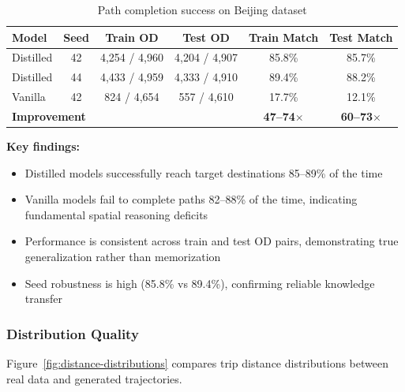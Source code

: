 \begin{table}[h]
    \centering
    \caption{Path completion success on Beijing dataset}
    \label{tab:od-results}
    \small
    \begin{tabular}{lccccc}
        \toprule
        \textbf{Model}                           & \textbf{Seed}           & \textbf{Train OD}       & \textbf{Test OD} & \textbf{Train Match} & \textbf{Test Match} \\
        \midrule
        Distilled                                & 42                      & 4,254 / 4,960           & 4,204 / 4,907    & 85.8\%               & 85.7\%              \\
        Distilled                                & 44                      & 4,433 / 4,959           & 4,333 / 4,910    & 89.4\%               & 88.2\%              \\
        Vanilla                                  & 42                      & 824 / 4,654             & 557 / 4,610      & 17.7\%               & 12.1\%              \\
        \midrule
        \multicolumn{4}{l}{\textbf{Improvement}} & \textbf{47--74$\times$} & \textbf{60--73$\times$}                                                                 \\
        \bottomrule
    \end{tabular}
\end{table}

\textbf{Key findings:}
\begin{itemize}[noitemsep,topsep=0pt]
    \item Distilled models successfully reach target destinations 85--89\% of the time
    \item Vanilla models fail to complete paths 82--88\% of the time, indicating fundamental spatial reasoning deficits
    \item Performance is consistent across train and test OD pairs, demonstrating true generalization rather than memorization
    \item Seed robustness is high (85.8\% vs 89.4\%), confirming reliable knowledge transfer
\end{itemize}

\subsubsection{Distribution Quality}

Figure~\ref{fig:distance-distributions} compares trip distance distributions between real data and generated trajectories.

